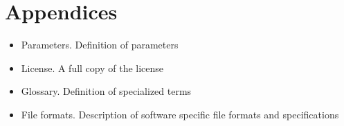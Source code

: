 \documentclass{article}
\renewcommand{\numberline}[1]{#1~}
\begin{document}
\appendix
\pagebreak

\let\myRefname\refname
\renewcommand\refname{%
  \addcontentsline{toc}{section}{\numberline{}References}
  \myRefname
}



\pagebreak
\section {Appendices}
\begin{itemize}
\item Parameters. Definition of parameters
\item License. A full copy of the license
\item Glossary. Definition of specialized terms
\item File formats. Description of software specific file formats and specifications

\end{itemize}
\end{document}
